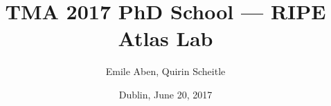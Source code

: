 %
% 
% 
%

\usepackage{soul}
\renewcommand{\PersonTitel}{}
\newcommand{\Datum}{\today}

\renewcommand{\PraesentationFusszeileZusatz}{TMA'17 RIPE Atlas Lab}

\title{TMA 2017 PhD School --- RIPE Atlas Lab}
\author{Emile Aben, Quirin Scheitle}
\institute[]{\UniversitaetName \\ \FakultaetName}
\date[\Datum]{Dublin, June 20, 2017}
\subject{}
\usepackage{tikz}


\usepackage{xspace}
\usepackage{todonotes}
\usepackage{tikz}
\usepackage{booktabs}


\usepackage{hyperref,xcolor,color,colortbl,graphicx,tabularx}
\usepackage{pgfplots}
\usepackage{multirow}
\usepackage{xspace}
\usepackage{environ}
\usepackage{comment}
\usepackage{subcaption}
\usepackage{subfloat}
\usepackage{textgreek}  %
\usepackage{soul} %




\newcommand{\packet}[3]{
	\draw[-latex,line width=0.7pt] (#1) to node[above,sloped]{\scriptsize{{#3}}} (#2);}

\newcommand{\dpacket}[3]{
	\draw[latex-latex,line width=0.7pt] (#1) to node[above,sloped]{\scriptsize{{#3}}} (#2);}

\usepackage{tumcolor}





